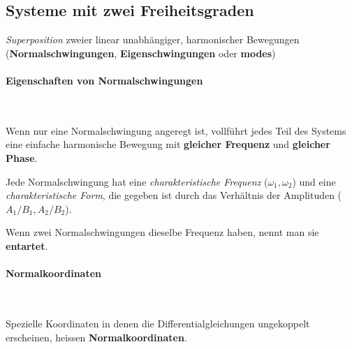 	\subsection{Systeme mit zwei Freiheitsgraden} %
		\emph{Superposition} zweier linear unabhängiger, harmonischer Bewegungen (\textbf{Normalschwingungen}, \textbf{Eigenschwingungen} oder \textbf{modes})
		
		\paragraph{Eigenschaften von Normalschwingungen} %
			~
			
			Wenn nur eine Normalschwingung angeregt ist, vollführt jedes Teil des Systems eine einfache harmonische Bewegung mit \textbf{gleicher Frequenz} und \textbf{gleicher Phase}.
			
			Jede Normalschwingung hat eine \emph{charakteristische Frequenz} ($\omega_1, \omega_2$) und eine \emph{charakteristische Form}, die gegeben ist durch das Verhältnis der Amplituden ($A_1/B_1, A_2/B_2$).
			
			Wenn zwei Normalschwingungen dieselbe Frequenz haben, nennt man sie \textbf{entartet}.
		
		\paragraph{Normalkoordinaten} %
			~
			
			Spezielle Koordinaten in denen die Differentialgleichungen ungekoppelt erscheinen, heissen \textbf{Normalkoordinaten}.

